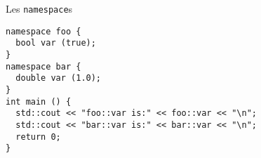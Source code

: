 \begin{frame}[fragile]{Les \texttt{namespace}s}
  \begin{lstlisting}
namespace foo {
  bool var (true);
}
namespace bar {
  double var (1.0);
}
int main () {
  std::cout << "foo::var is:" << foo::var << "\n";
  std::cout << "bar::var is:" << bar::var << "\n";
  return 0;
}
  \end{lstlisting}
\end{frame}
